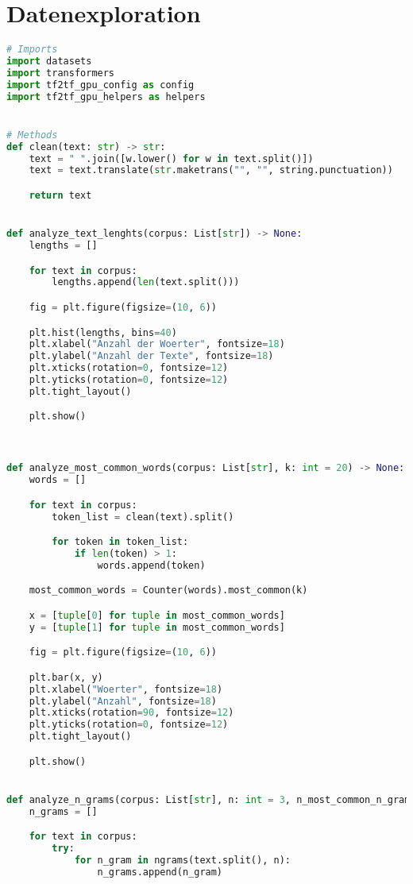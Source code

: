 \section*{Datenexploration}
\begin{lstlisting}[language=Python, caption=Datenexploration]
# Imports
import datasets
import transformers
import tf2tf_gpu_config as config
import tf2tf_gpu_helpers as helpers


# Methods
def clean(text: str) -> str:
    text = " ".join([w.lower() for w in text.split()])
    text = text.translate(str.maketrans("", "", string.punctuation))

    return text


def analyze_text_lenghts(corpus: List[str]) -> None:
    lengths = []

    for text in corpus:
        lengths.append(len(text.split()))

    fig = plt.figure(figsize=(10, 6))

    plt.hist(lengths, bins=40)
    plt.xlabel("Anzahl der Woerter", fontsize=18)
    plt.ylabel("Anzahl der Texte", fontsize=18)
    plt.xticks(rotation=0, fontsize=12)
    plt.yticks(rotation=0, fontsize=12)
    plt.tight_layout()

    plt.show()



def analyze_most_common_words(corpus: List[str], k: int = 20) -> None:
    words = []

    for text in corpus:
        token_list = clean(text).split()

        for token in token_list:
            if len(token) > 1:
                words.append(token)

    most_common_words = Counter(words).most_common(k)

    x = [tuple[0] for tuple in most_common_words]
    y = [tuple[1] for tuple in most_common_words]

    fig = plt.figure(figsize=(10, 6))

    plt.bar(x, y)
    plt.xlabel("Woerter", fontsize=18)
    plt.ylabel("Anzahl", fontsize=18)
    plt.xticks(rotation=90, fontsize=12)
    plt.yticks(rotation=0, fontsize=12)
    plt.tight_layout()

    plt.show()


def analyze_n_grams(corpus: List[str], n: int = 3, n_most_common_n_grams: int = 20) -> None:
    n_grams = []

    for text in corpus:
        try:
            for n_gram in ngrams(text.split(), n):
                n_grams.append(n_gram)


\end{lstlisting}
